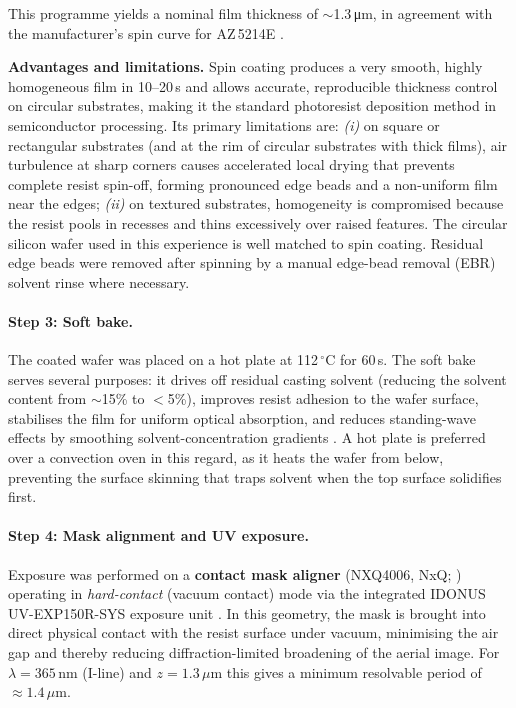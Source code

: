 This programme yields a nominal film thickness of
$\sim$1.3\,\si{\micro\meter}, in agreement with the manufacturer's
spin curve for AZ\,5214E \cite{AZ5214E_TDS}.

\textbf{Advantages and limitations.} Spin coating produces a very
smooth, highly homogeneous film in 10--20\,s and allows accurate,
reproducible thickness control on circular substrates, making it the
standard photoresist deposition method in semiconductor processing.
Its primary limitations are: \emph{(i)} on square or rectangular
substrates (and at the rim of circular substrates with thick films),
air turbulence at sharp corners causes accelerated local drying that
prevents complete resist spin-off, forming pronounced edge beads and
a non-uniform film near the edges; \emph{(ii)} on textured
substrates, homogeneity is compromised because the resist pools in
recesses and thins excessively over raised features. The circular
silicon wafer used in this experience is well matched to spin
coating. Residual edge beads were removed after spinning by a manual
edge-bead removal (EBR) solvent rinse where necessary.

\paragraph{Step 3: Soft bake.}
The coated wafer was placed on a hot plate at 112\,$^\circ$C for 60\,s. The soft
bake serves several purposes: it drives off residual casting solvent
(reducing the
solvent content from $\sim$15\% to $<$5\%), improves resist adhesion
to the wafer
surface, stabilises the film for uniform optical absorption, and reduces
standing-wave effects by smoothing solvent-concentration gradients
\cite{FundTechProc2024}. A hot plate is preferred over a convection oven in this
regard, as it heats the wafer from below, preventing the surface
skinning that traps
solvent when the top surface solidifies first.

\paragraph{Step 4: Mask alignment and UV exposure.}
Exposure was performed on a \textbf{contact mask aligner} (NXQ4006,
NxQ; \cite{NXQ4006})
operating in \emph{hard-contact} (vacuum contact) mode via the
integrated IDONUS UV-EXP150R-SYS exposure unit \cite{IDONUS_UV}. In
this geometry, the mask is brought into direct physical
contact with the resist surface under vacuum, minimising the air gap and thereby
reducing diffraction-limited broadening of the aerial image. For
$\lambda = 365$\,nm (I-line) and $z = 1.3\,\mu$m this gives a
minimum resolvable period of ${\approx}1.4\,\mu$m.


